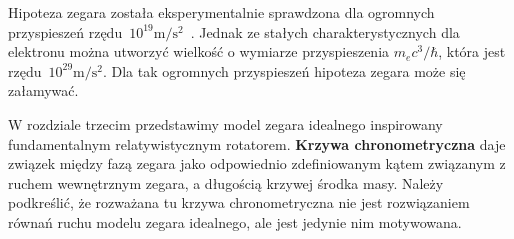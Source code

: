 Hipoteza zegara 
została eksperymentalnie sprawdzona dla ogromnych 
przyspieszeń 
rzędu~$10^{19}\si{\metre\per\second^2}$~\cite{Bailey1977}. Jednak 
ze stałych charakterystycznych dla elektronu 
można utworzyć wielkość o wymiarze przyspieszenia $m_e c^3/\hbar$, 
która jest rzędu~$10^{29}\si{\metre\per\second^2}$. Dla 
tak ogromnych przyspieszeń hipoteza zegara może się załamywać.

W rozdziale trzecim przedstawimy model zegara idealnego inspirowany
fundamentalnym relatywistycznym rotatorem. 
\textbf{Krzywa chronometryczna} daje związek między fazą zegara jako 
odpowiednio zdefiniowanym kątem związanym z ruchem 
wewnętrznym zegara, a długością krzywej 
środka masy. Należy podkreślić, że rozważana 
tu krzywa chronometryczna nie jest rozwiązaniem równań ruchu 
modelu zegara idealnego, ale jest jedynie nim motywowana.

